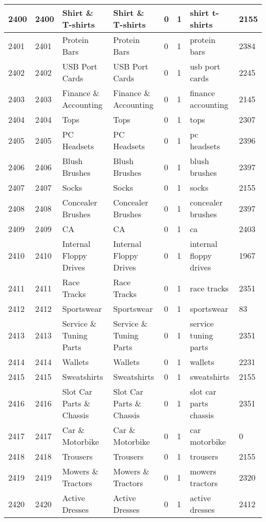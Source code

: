 \begin{longtable}{|l|l|l|l|l|l|l|l|}
2400 & 2400 & Shirt \& T-shirts & Shirt \& T-shirts & 0 & 1 & shirt t-shirts & 2155 \\ \hline 
2401 & 2401 & Protein Bars & Protein Bars & 0 & 1 & protein bars & 2384 \\ \hline 
2402 & 2402 & USB Port Cards & USB Port Cards & 0 & 1 & usb port cards & 2245 \\ \hline 
2403 & 2403 & Finance \& Accounting & Finance \& Accounting & 0 & 1 & finance accounting & 2145 \\ \hline 
2404 & 2404 & Tops & Tops & 0 & 1 & tops & 2307 \\ \hline 
2405 & 2405 & PC Headsets & PC Headsets & 0 & 1 & pc headsets & 2396 \\ \hline 
2406 & 2406 & Blush Brushes & Blush Brushes & 0 & 1 & blush brushes & 2397 \\ \hline 
2407 & 2407 & Socks & Socks & 0 & 1 & socks & 2155 \\ \hline 
2408 & 2408 & Concealer Brushes & Concealer Brushes & 0 & 1 & concealer brushes & 2397 \\ \hline 
2409 & 2409 & CA & CA & 0 & 1 & ca & 2403 \\ \hline 
2410 & 2410 & Internal Floppy Drives & Internal Floppy Drives & 0 & 1 & internal floppy drives & 1967 \\ \hline 
2411 & 2411 & Race Tracks & Race Tracks & 0 & 1 & race tracks & 2351 \\ \hline 
2412 & 2412 & Sportswear & Sportswear & 0 & 1 & sportswear & 83 \\ \hline 
2413 & 2413 & Service \& Tuning Parts & Service \& Tuning Parts & 0 & 1 & service tuning parts & 2351 \\ \hline 
2414 & 2414 & Wallets & Wallets & 0 & 1 & wallets & 2231 \\ \hline 
2415 & 2415 & Sweatshirts & Sweatshirts & 0 & 1 & sweatshirts & 2155 \\ \hline 
2416 & 2416 & Slot Car Parts \& Chassis & Slot Car Parts \& Chassis & 0 & 1 & slot car parts chassis & 2351 \\ \hline 
2417 & 2417 & Car \& Motorbike & Car \& Motorbike & 0 & 1 & car motorbike & 0 \\ \hline 
2418 & 2418 & Trousers & Trousers & 0 & 1 & trousers & 2155 \\ \hline 
2419 & 2419 & Mowers \& Tractors & Mowers \& Tractors & 0 & 1 & mowers tractors & 2320 \\ \hline 
2420 & 2420 & Active Dresses & Active Dresses & 0 & 1 & active dresses & 2412 \\ \hline 

\end{longtable}
